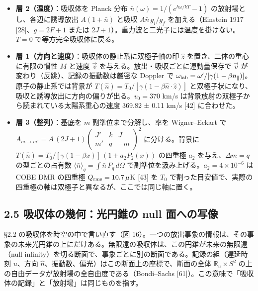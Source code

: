 \documentclass[
  a4paper,
]{ltjsarticle}
\providecommand{\tightlist}{%
  \setlength{\itemsep}{0pt}\setlength{\parskip}{0pt}}
\begin{document}
\begin{itemize}
\tightlist
\item
  \textbf{層 2（温度）}：吸収体を Planck 分布
  \(\bar n(\omega)=1/(e^{\hbar\omega/kT}-1)\)
  の放射場とし、各辺に誘導放出 \(A(1+\bar n)\) と吸収
  \(A\bar n\,g_i/g_f\) を加える（Einstein 1917 {[}28{]}、\(g=2F+1\)
  または \(2J+1\)）。重力波と二光子には温度を掛けない。\(T=0\)
  で等方完全吸収体に戻る。
\item
  \textbf{層 1（方向と速度）}：吸収体の静止系に双極子軸の印 \(\hat z\)
  を置き、二体の重心に有限の慣性 \(M\) と速度 \(\vec v\)
  を与える。放出・吸収ごとに運動量保存で \(\vec v\)
  が変わり（反跳）、記録の振動数は厳密な Doppler で
  \(\omega_{\rm lab}=\omega'/[\gamma(1-\beta n_\parallel)]\)。原子の静止系では背景が
  \(T(\hat n)=T_0/[\gamma(1-\beta\hat n\cdot\hat z)]\)
  と双極子状になり、吸収と誘導放出に方向の偏りが出る。\(v_0=370\) km/s
  は背景放射の双極子から読まれている太陽系重心の速度 369.82 ± 0.11 km/s
  {[}42{]} に合わせた。
\item
  \textbf{層 3（整列）}：基底を \(m\) 副準位まで分解し、率を
  Wigner--Eckart で
  \(A_{m\to m'}=A\,(2J+1)\begin{pmatrix}J'&k&J\\ m'&q&-m\end{pmatrix}^2\)
  に分ける。背景に \(T(\hat n)=T_0/[\gamma(1-\beta x)]\,(1+a_2P_2(x))\)
  の四重極 \(a_2\) を与え、\(\Delta m=q\) の型ごとの占有数
  \(\langle\bar n\rangle_q=\int\bar n\,P_q\,d\Omega\)
  で副準位を汲み上げる。\(a_2=4\times10^{-6}\) は COBE DMR の四重極
  \(Q_{\rm rms}=10.7\,\mu\)K {[}43{]} を \(T_0\)
  で割った目安値で、実際の四重極の軸は双極子と異なるが、ここでは同じ軸に置く。
\end{itemize}

\subsection{2.5 吸収体の幾何：光円錐の null
面への写像}\label{ux5438ux53ceux4f53ux306eux5e7eux4f55ux5149ux5186ux9310ux306e-null-ux9762ux3078ux306eux5199ux50cf}

§2.2 の吸収体を時空の中で言い直す（図
16）。一つの放出事象の情報は、その事象の未来光円錐の上にだけある。無限遠の吸収体は、この円錐が未来の無限遠（null
infinity）を切る断面で、事象ごとに別の断面である。記録の組（遅延時刻
\(u\)、方向 \(\hat n\)、振動数、偏光）はこの断面上の座標で、断面の全体
\(\mathbb R_u\times S^2\)
の上の自由データが放射場の全自由度である（Bondi--Sachs
{[}61{]}）。この意味で「吸収体の記録」と「放射場」は同じものを指す。
\end{document}
